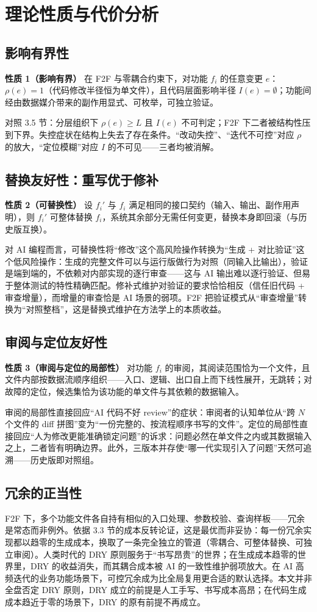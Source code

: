 \documentclass[11pt,a4paper]{ctexart}
\begin{document}
\section{理论性质与代价分析}
\subsection{影响有界性}
\textbf{性质 1（影响有界）} 在 F2F 与零耦合约束下，对功能 $f_i$ 的任意变更 $e$：$\rho(e)=1$（代码修改半径恒为单文件），且代码层面影响半径 $I(e)=\emptyset$；功能间经由数据媒介带来的副作用显式、可枚举，可独立验证。

对照 3.5 节：分层组织下 $\rho(e)\ge L$ 且 $I(e)$ 不可判定；F2F 下二者被结构性压到下界。失控症状在结构上失去了存在条件。“改动失控”、“迭代不可控”对应 $\rho$ 的放大，“定位模糊”对应 $I$ 的不可见——三者均被消解。

\subsection{替换友好性：重写优于修补}
\textbf{性质 2（可替换性）} 设 $f_i'$ 与 $f_i$ 满足相同的接口契约（输入、输出、副作用声明），则 $f_i'$ 可整体替换 $f_i$，系统其余部分无需任何变更，替换本身即回滚（与历史版互换）。

对 AI 编程而言，可替换性将“修改”这个高风险操作转换为“生成 + 对比验证”这个低风险操作：生成的完整文件可以与运行版做行为对照（同输入比输出），验证是端到端的，不依赖对内部实现的逐行审查——这与 AI 输出难以逐行验证、但易于整体测试的特性精确匹配。修补式维护对验证的要求恰恰相反（信任旧代码 + 审查增量），而增量的审查恰是 AI 场景的弱项。F2F 把验证模式从“审查增量”转换为“对照整档”，这是替换式维护在方法学上的本质收益。

\subsection{审阅与定位友好性}
\textbf{性质 3（审阅与定位的局部性）} 对功能 $f_i$ 的审阅，其阅读范围恰为一个文件，且文件内部按数据流顺序组织——入口、逻辑、出口自上而下线性展开，无跳转；对故障的定位，候选集恰为该功能的单文件与其依赖的数据输入。

审阅的局部性直接回应“AI 代码不好 review”的症状：审阅者的认知单位从“跨 $N$ 个文件的 diff 拼图”变为“一份完整的、按流程顺序书写的文件”。定位的局部性直接回应“人为修改更能准确锁定问题”的诉求：问题必然在单文件之内或其数据输入之上，二者皆有明确边界。此外，三版本并存使“哪一代实现引入了问题”天然可追溯——历史版即对照组。

\subsection{冗余的正当性}
F2F 下，多个功能文件各自持有相似的入口处理、参数校验、查询样板——冗余是常态而非例外。依据 3.3 节的成本反转论证，这是最优而非妥协：每一份冗余实现都以趋零的生成成本，换取了一条完全独立的管道（零耦合、可整体替换、可独立审阅）。人类时代的 DRY 原则服务于“书写昂贵”的世界；在生成成本趋零的世界里，DRY 的收益消失，而其耦合成本被 AI 的一致性维护弱项放大。在 AI 高频迭代的业务功能场景下，可控冗余成为比全局复用更合适的默认选择。本文并非全盘否定 DRY 原则，DRY 成立的前提是人工手写、书写成本高昂；在代码生成成本趋近于零的场景下，DRY 的原有前提不再成立。
\end{document}
